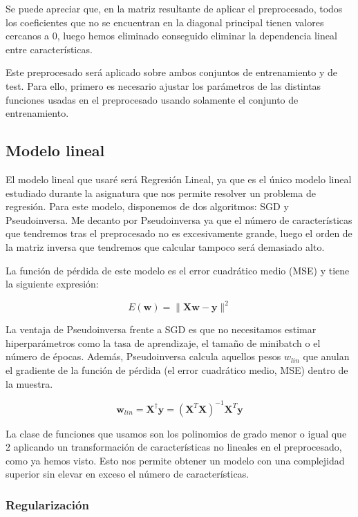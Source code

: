 \documentclass[10pt,a4paper]{article}
\begin{document}
Se puede apreciar que, en la matriz resultante de aplicar el preprocesado, todos los coeficientes que no se encuentran en la diagonal principal tienen valores cercanos a 0, luego hemos eliminado conseguido eliminar la dependencia lineal entre características.

Este preprocesado será aplicado sobre ambos conjuntos de entrenamiento y de test. Para ello, primero es necesario ajustar los parámetros de las distintas funciones usadas en el preprocesado usando solamente el conjunto de entrenamiento.



\subsection{Modelo lineal}

El modelo lineal que usaré será Regresión Lineal, ya que es el único modelo lineal estudiado durante la asignatura que nos permite resolver un problema de regresión. Para este modelo, disponemos de dos algoritmos: SGD y Pseudoinversa. Me decanto por Pseudoinversa ya que el número de características que tendremos tras el preprocesado no es excesivamente grande, luego el orden de la matriz inversa que tendremos que calcular tampoco será demasiado alto.

La función de pérdida de este modelo es el error cuadrático medio (MSE) y tiene la siguiente expresión:

$$E(\textbf{w}) = \|\textbf{X}\textbf{w}-\textbf{y}\|^2$$

La ventaja de Pseudoinversa frente a SGD es que no necesitamos estimar hiperparámetros como la tasa de aprendizaje, el tamaño de minibatch o el número de épocas. Además, Pseudoinversa calcula aquellos pesos $w_{lin}$ que anulan el gradiente de la función de pérdida (el error cuadrático medio, MSE) dentro de la muestra.

$$\textbf{w}_{lin} = \textbf{X}^{\dag} \textbf{y} = (\textbf{X}^T \textbf{X})^{-1}\textbf{X}^T \textbf{y}$$ 

La clase de funciones que usamos son los polinomios de grado menor o igual que 2 aplicando un transformación de características no lineales en el preprocesado, como ya hemos visto. Esto nos permite obtener un modelo con una complejidad superior sin elevar en exceso el número de características.

\subsubsection{Regularización}
\end{document}
